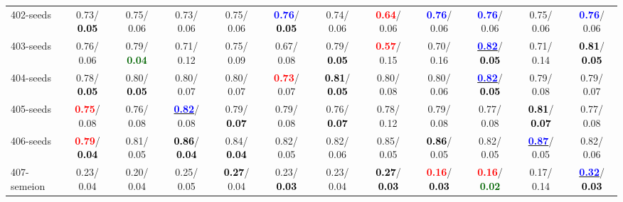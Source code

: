 \begin{table}[h]
\begin{center}
{\begin{tabular}{lc|c|c|c|c|c|c|c|c|c|c}
402-seeds &   0.73/\textcolor{black}{\textbf{  0.05}} &   0.75/  0.06 &   0.73/  0.06 &   0.75/  0.06 & \textcolor{blue}{\textbf{  0.76}}/\textcolor{black}{\textbf{  0.05}} &   0.74/  0.06 & \textcolor{red}{\textbf{  0.64}}/  0.06 & \textcolor{blue}{\textbf{  0.76}}/  0.06 & \textcolor{blue}{\textbf{  0.76}}/  0.06 &   0.75/  0.06 & \textcolor{blue}{\textbf{  0.76}}/  0.06 \\
403-seeds &   0.76/  0.06 &   0.79/\textcolor{darkgreen}{\textbf{  0.04}} &   0.71/  0.12 &   0.75/  0.09 &   0.67/  0.08 &   0.79/\textcolor{black}{\textbf{  0.05}} & \textcolor{red}{\textbf{  0.57}}/  0.15 &   0.70/  0.16 & \underline{\textcolor{blue}{\textbf{  0.82}}}/\textcolor{black}{\textbf{  0.05}} &   0.71/  0.14 & \textcolor{black}{\textbf{  0.81}}/\textcolor{black}{\textbf{  0.05}} \\
404-seeds &   0.78/\textcolor{black}{\textbf{  0.05}} &   0.80/\textcolor{black}{\textbf{  0.05}} &   0.80/  0.07 &   0.80/  0.07 & \textcolor{red}{\textbf{  0.73}}/  0.07 & \textcolor{black}{\textbf{  0.81}}/\textcolor{black}{\textbf{  0.05}} &   0.80/  0.08 &   0.80/  0.06 & \underline{\textcolor{blue}{\textbf{  0.82}}}/\textcolor{black}{\textbf{  0.05}} &   0.79/  0.08 &   0.79/  0.07 \\
405-seeds & \textcolor{red}{\textbf{  0.75}}/  0.08 &   0.76/  0.08 & \underline{\textcolor{blue}{\textbf{  0.82}}}/  0.08 &   0.79/\textcolor{black}{\textbf{  0.07}} &   0.79/  0.08 &   0.76/\textcolor{black}{\textbf{  0.07}} &   0.78/  0.12 &   0.79/  0.08 &   0.77/  0.08 & \textcolor{black}{\textbf{  0.81}}/\textcolor{black}{\textbf{  0.07}} &   0.77/  0.08 \\ \hline
406-seeds & \textcolor{red}{\textbf{  0.79}}/\textcolor{black}{\textbf{  0.04}} &   0.81/  0.05 & \textcolor{black}{\textbf{  0.86}}/\textcolor{black}{\textbf{  0.04}} &   0.84/\textcolor{black}{\textbf{  0.04}} &   0.82/  0.05 &   0.82/  0.06 &   0.85/  0.05 & \textcolor{black}{\textbf{  0.86}}/  0.05 &   0.82/  0.05 & \underline{\textcolor{blue}{\textbf{  0.87}}}/  0.05 &   0.82/  0.06 \\
407-semeion &   0.23/  0.04 &   0.20/  0.04 &   0.25/  0.05 & \textcolor{black}{\textbf{  0.27}}/  0.04 &   0.23/\textcolor{black}{\textbf{  0.03}} &   0.23/  0.04 & \textcolor{black}{\textbf{  0.27}}/\textcolor{black}{\textbf{  0.03}} & \textcolor{red}{\textbf{  0.16}}/\textcolor{black}{\textbf{  0.03}} & \textcolor{red}{\textbf{  0.16}}/\textcolor{darkgreen}{\textbf{  0.02}} &   0.17/  0.14 & \underline{\textcolor{blue}{\textbf{  0.32}}}/\textcolor{black}{\textbf{  0.03}} \\

\end{tabular}}
\end{center}
\end{table}
